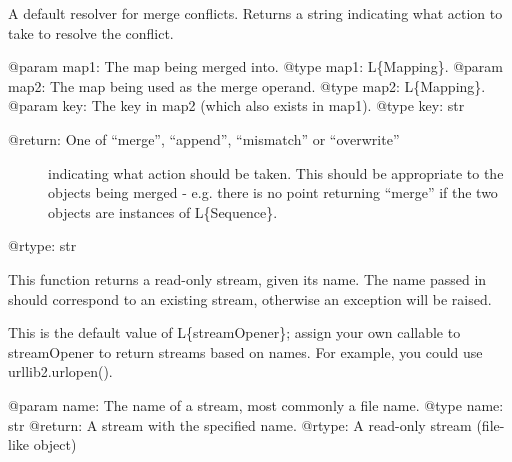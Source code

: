 \documentclass[a4paper,10pt,english]{sphinxmanual}
\begin{document}

\begin{fulllineitems}
\label{\detokenize{commands/apidoc/src:src.pyconf.deepCopyMapping}}
\end{fulllineitems}


\begin{fulllineitems}
\label{\detokenize{commands/apidoc/src:src.pyconf.defaultMergeResolve}}
A default resolver for merge conflicts. 
Returns a string indicating what action to take to resolve the conflict.

@param map1: The map being merged into.
@type map1: L\{Mapping\}.
@param map2: The map being used as the merge operand.
@type map2: L\{Mapping\}.
@param key: The key in map2 (which also exists in map1).
@type key: str
\begin{description}
\item[{@return: One of “merge”, “append”, “mismatch” or “overwrite”}] \leavevmode
indicating what action should be taken. This should
be appropriate to the objects being merged - e.g.
there is no point returning “merge” if the two objects
are instances of L\{Sequence\}.

\end{description}

@rtype: str

\end{fulllineitems}


\begin{fulllineitems}
\label{\detokenize{commands/apidoc/src:src.pyconf.defaultStreamOpener}}
This function returns a read-only stream, given its name. The name passed
in should correspond to an existing stream, otherwise an exception will be
raised.

This is the default value of L\{streamOpener\}; assign your own callable to
streamOpener to return streams based on names. For example, you could use
urllib2.urlopen().

@param name: The name of a stream, most commonly a file name.
@type name: str
@return: A stream with the specified name.
@rtype: A read-only stream (file-like object)

\end{fulllineitems}
\end{document}
